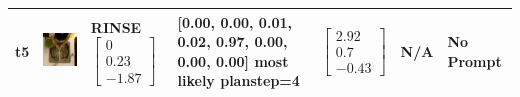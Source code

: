 \begin{longtable}{| V{0.8cm} | V{2.6cm} | V{1.6cm} | V{2.1cm} | V{1.55cm} | V{1.6cm} | V{3.2cm} |}
t5 &
\includegraphics[width=\linewidth]{fig/system/_fast2-rinse_.jpg} &
RINSE
\linebreak\linebreak
$\begin{bmatrix}
0 \\
0.23 \\
-1.87
\end{bmatrix}$ &
[0.00, 0.00, 0.01, 0.02, 0.97, 0.00, 0.00, 0.00] most likely planstep=4 &
$\begin{bmatrix}
2.92 \\
0.7 \\
-0.43
\end{bmatrix}$ &
N/A &
No Prompt
\\ \hline



\end{longtable}
